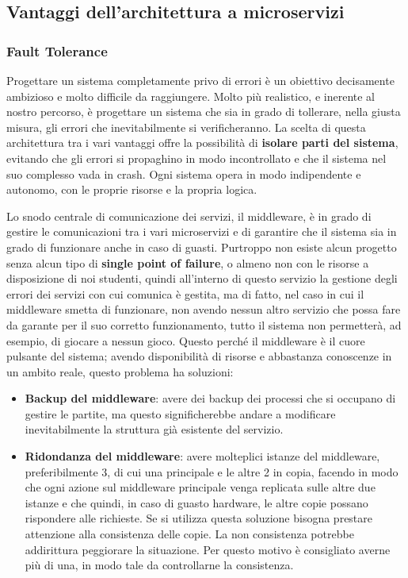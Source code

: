
\subsection{Vantaggi dell'architettura a microservizi}

\subsubsection{Fault Tolerance}

Progettare un sistema completamente privo di errori è un obiettivo decisamente ambizioso e molto difficile da raggiungere. 
Molto più realistico, e inerente al nostro percorso, è progettare un sistema che sia in grado di tollerare, nella giusta misura, gli errori che inevitabilmente si verificheranno. 
La scelta di questa architettura tra i vari vantaggi offre la possibilità di \textbf{isolare parti del sistema}, evitando che gli errori si propaghino in modo incontrollato e che il sistema nel suo complesso vada in crash. 
Ogni sistema opera in modo indipendente e autonomo, con le proprie risorse e la propria logica.
\vspace{1cm}

Lo snodo centrale di comunicazione dei servizi, il middleware, è in grado di gestire le comunicazioni tra i vari microservizi e di garantire che il sistema sia in grado di funzionare anche in caso di guasti.
Purtroppo non esiste alcun progetto senza alcun tipo di \textbf{single point of failure}, o almeno non con le risorse a disposizione di noi studenti, quindi all'interno di questo servizio la 
gestione degli errori dei servizi con cui comunica è gestita, ma di fatto, nel caso in cui il middleware smetta di funzionare, non avendo nessun altro servizio che possa fare da garante 
per il suo corretto funzionamento, tutto il sistema non permetterà, ad esempio, di giocare a nessun gioco.
Questo perché il middleware è il cuore pulsante del sistema; avendo disponibilità di risorse e abbastanza conoscenze in un ambito reale, questo problema ha soluzioni: 
\begin{itemize}
    \item \textbf{Backup del middleware}: avere dei backup dei processi che si occupano di gestire le partite, ma questo significherebbe andare a modificare inevitabilmente 
    la struttura già esistente del servizio.
    \item \textbf{Ridondanza del middleware}: avere molteplici istanze del middleware, preferibilmente 3, di cui una principale e le altre 2 in copia, facendo in modo che
    ogni azione sul middleware principale venga replicata sulle altre due istanze e che quindi, in caso di guasto hardware, le altre copie possano rispondere alle richieste.
    Se si utilizza questa soluzione bisogna prestare attenzione alla consistenza delle copie. La non consistenza potrebbe addirittura peggiorare la situazione.
    Per questo motivo è consigliato averne più di una, in modo tale da controllarne la consistenza.
\end{itemize}

